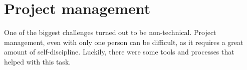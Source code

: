 \section{Project management}\label{project-management}

One of the biggest challenges turned out to be non-technical.
Project management,
even with only one person can be difficult,
as it requires a great amount of self-discipline.
Luckily, there were some tools and processes that helped with this task.



